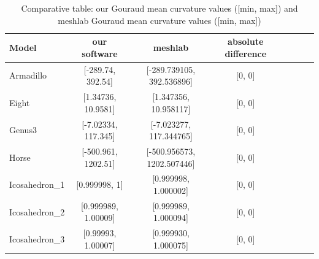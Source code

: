 \begin{table}[!h]%
    \centering
\begin{tabular}{l*{6}{c}r}
    \centering
    Model              & our software &  meshlab  & absolute difference\\
    \hline
    Armadillo          & [-289.74, 392.54] & [-289.739105, 392.536896] & [0, 0]\\
    Eight              & [1.34736, 10.9581] & [1.347356, 10.958117] & [0, 0]\\
    Genus3             & [-7.02334, 117.345] & [-7.023277, 117.344765] & [0, 0] \\
    Horse              & [-500.961, 1202.51] &  [-500.956573, 1202.507446] & [0, 0]\\
    Icosahedron\_1      &  [0.999998, 1] & [0.999998, 1.000002] & [0, 0]\\
    Icosahedron\_2      &  [0.999989, 1.00009] & [0.999989, 1.000094]& [0, 0] \\
    Icosahedron\_3      & [0.99993, 1.00007] &  [0.999930, 1.000075] & [0, 0]
\end{tabular}
\caption{Comparative table: our Gouraud mean curvature values ([min, max]) and meshlab Gouraud mean curvature values ([min, max])}
\label{table:table-mean-meshlab}
\end{table}


